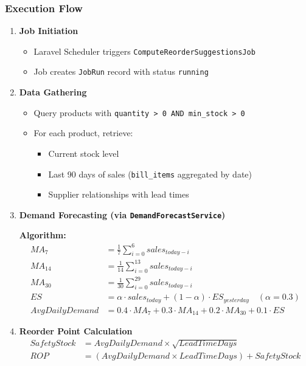 \subsubsection{Execution Flow}

\begin{enumerate}[leftmargin=*]
    \item \textbf{Job Initiation}
    \begin{itemize}
        \item Laravel Scheduler triggers \texttt{ComputeReorderSuggestionsJob}
        \item Job creates \texttt{JobRun} record with status \texttt{running}
    \end{itemize}
    
    \item \textbf{Data Gathering}
    \begin{itemize}
        \item Query products with \texttt{quantity > 0 AND min\_stock > 0}
        \item For each product, retrieve:
        \begin{itemize}
            \item Current stock level
            \item Last 90 days of sales (\texttt{bill\_items} aggregated by date)
            \item Supplier relationships with lead times
        \end{itemize}
    \end{itemize}
    
    \item \textbf{Demand Forecasting (via \texttt{DemandForecastService})}
    
    \textbf{Algorithm:}
    \begin{align*}
        MA_7 &= \frac{1}{7} \sum_{i=0}^{6} sales_{today-i} \\
        MA_{14} &= \frac{1}{14} \sum_{i=0}^{13} sales_{today-i} \\
        MA_{30} &= \frac{1}{30} \sum_{i=0}^{29} sales_{today-i} \\
        ES &= \alpha \cdot sales_{today} + (1-\alpha) \cdot ES_{yesterday} \quad (\alpha=0.3) \\
        AvgDailyDemand &= 0.4 \cdot MA_7 + 0.3 \cdot MA_{14} + 0.2 \cdot MA_{30} + 0.1 \cdot ES
    \end{align*}
    
    \item \textbf{Reorder Point Calculation}
    \begin{align*}
        SafetyStock &= AvgDailyDemand \times \sqrt{LeadTimeDays} \\
        ROP &= (AvgDailyDemand \times LeadTimeDays) + SafetyStock
    \end{align*}
    

\end{enumerate}
